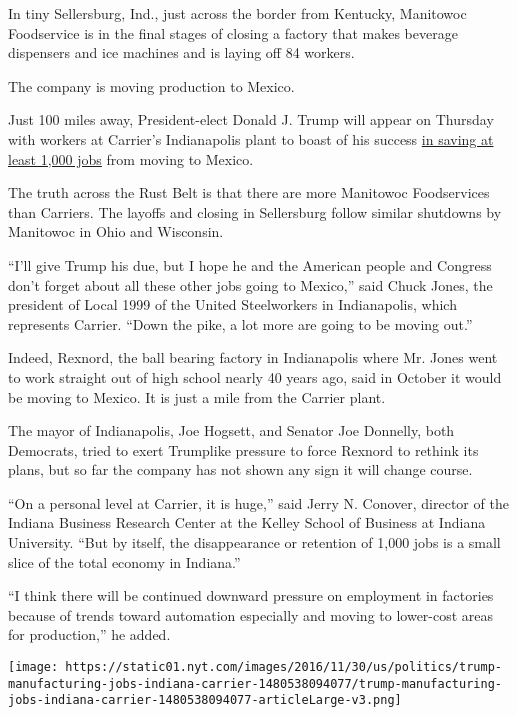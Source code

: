 In tiny Sellersburg, Ind., just across the border from Kentucky,
Manitowoc Foodservice is in the final stages of closing a factory that
makes beverage dispensers and ice machines and is laying off 84 workers.

The company is moving production to Mexico.

Just 100 miles away, President-elect Donald J. Trump will appear on
Thursday with workers at Carrier's Indianapolis plant to boast of his
success
\href{http://www.nytimes.com/2016/11/29/business/trump-to-announce-carrier-plant-will-keep-jobs-in-us.html}{in
saving at least 1,000 jobs} from moving to Mexico.

The truth across the Rust Belt is that there are more Manitowoc
Foodservices than Carriers. The layoffs and closing in Sellersburg
follow similar shutdowns by Manitowoc in Ohio and Wisconsin.

``I'll give Trump his due, but I hope he and the American people and
Congress don't forget about all these other jobs going to Mexico,'' said
Chuck Jones, the president of Local 1999 of the United Steelworkers in
Indianapolis, which represents Carrier. ``Down the pike, a lot more are
going to be moving out.''

Indeed, Rexnord, the ball bearing factory in Indianapolis where Mr.
Jones went to work straight out of high school nearly 40 years ago, said
in October it would be moving to Mexico. It is just a mile from the
Carrier plant.

The mayor of Indianapolis, Joe Hogsett, and Senator Joe Donnelly, both
Democrats, tried to exert Trumplike pressure to force Rexnord to rethink
its plans, but so far the company has not shown any sign it will change
course.

``On a personal level at Carrier, it is huge,'' said Jerry N. Conover,
director of the Indiana Business Research Center at the Kelley School of
Business at Indiana University. ``But by itself, the disappearance or
retention of 1,000 jobs is a small slice of the total economy in
Indiana.''

``I think there will be continued downward pressure on employment in
factories because of trends toward automation especially and moving to
lower-cost areas for production,'' he added.

\href{https://www.nytimes.com/interactive/2016/11/30/us/politics/trump-manufacturing-jobs-indiana-carrier.html}{}

\texttt{[image: https://static01.nyt.com/images/2016/11/30/us/politics/trump-manufacturing-jobs-indiana-carrier-1480538094077/trump-manufacturing-jobs-indiana-carrier-1480538094077-articleLarge-v3.png]}

